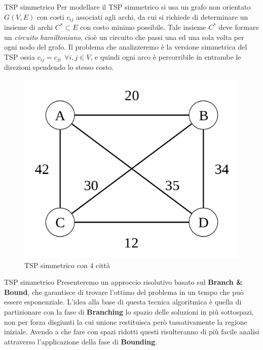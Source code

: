 \documentclass[10pt]{beamer}
\begin{document}
\begin{frame}{TSP simmetrico}
    Per modellare il TSP simmetrico si usa un grafo non orientato $G(V,E)$ con costi $c_{ij}$ associati agli archi, da cui si richiede di determinare un insieme di archi $C^* \subset E$ con costo minimo possibile. Tale insieme $C^*$ deve formare un \textit{circuito hamiltoniano}, cioè un circuito che passi una ed una sola volta per ogni nodo del grafo. Il problema che analizzeremo è la versione simmetrica del TSP ossia $c_{ij} = c_{ji} \:\: \forall i,j \in V$, e quindi ogni arco è percorribile in entrambe le direzioni spendendo lo stesso costo.
    \begin{figure}
        \centering
        \includegraphics[scale=0.11]{files/SimmetricTSP.png}
        \caption{TSP simmetrico con 4 città}
    \end{figure}
\end{frame}

\begin{frame}{TSP simmetrico}
    Presenteremo un approccio risolutivo basato sul \textbf{Branch \& Bound}, che garantisce di trovare l'ottimo del problema in un tempo che può essere esponenziale. L'idea alla base di questa tecnica algoritmica è quella di partizionare con la fase di \textbf{Branching} lo spazio delle soluzioni in più sottospazi, non per forza disgiunti la cui unione restituisca però tassativamente la regione iniziale. Avendo a che fare con spazi ridotti questi risulteranno di più facile analisi attraverso l'applicazione della fase di \textbf{Bounding}.
\end{frame}
\end{document}
